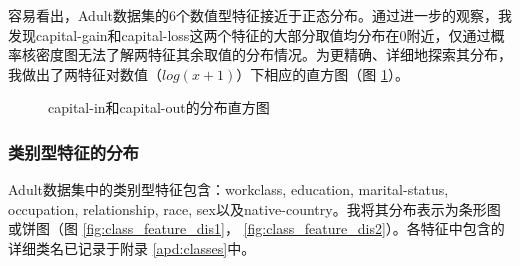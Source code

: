 \documentclass[12pt,a4paper]{article}
\theoremstyle{definition}
\begin{document}
\vspace{0.01\linewidth}
容易看出，Adult数据集的6个数值型特征接近于正态分布。通过进一步的观察，我发现capital-gain和capital-loss这两个特征的大部分取值均分布在0附近，仅通过概率核密度图无法了解两特征其余取值的分布情况。为更精确、详细地探索其分布，我做出了两特征对数值（$log(x + 1)$）下相应的直方图（图 \ref{fig:cap-in-out}）。

\begin{figure}[H]
	\centering
	\caption{capital-in和capital-out的分布直方图}
	\label{fig:cap-in-out}
\end{figure}

\subsubsection{类别型特征的分布}

Adult数据集中的类别型特征包含：workclass, education, marital-status, occupation, relationship, race, sex以及native-country。我将其分布表示为条形图或饼图（图 \ref{fig:class_feature_dis1}， \ref{fig:class_feature_dis2}）。各特征中包含的详细类名已记录于附录 \ref{apd:classes}中。
\end{document}
